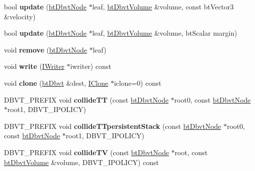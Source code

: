 \begin{DoxyCompactItemize}
\mbox{\label{structbtDbvt_ac4ec3a1dec7bc12e0803159a6d53e4b3}} 
bool {\bfseries update} (\hyperlink{structbtDbvtNode}{bt\+Dbvt\+Node} $\ast$leaf, \hyperlink{structbtDbvtAabbMm}{bt\+Dbvt\+Volume} \&volume, const bt\+Vector3 \&velocity)
\item 
\mbox{\label{structbtDbvt_a0f6e436b7a7dd41d1ea1b732b26f0a5c}} 
bool {\bfseries update} (\hyperlink{structbtDbvtNode}{bt\+Dbvt\+Node} $\ast$leaf, \hyperlink{structbtDbvtAabbMm}{bt\+Dbvt\+Volume} \&volume, bt\+Scalar margin)
\item 
\mbox{\label{structbtDbvt_ae01b804da6734f4ce250f6fe7ef0b5fb}} 
void {\bfseries remove} (\hyperlink{structbtDbvtNode}{bt\+Dbvt\+Node} $\ast$leaf)
\item 
\mbox{\label{structbtDbvt_a528b672e2aa8cbadb66943344bda6c2f}} 
void {\bfseries write} (\hyperlink{structbtDbvt_1_1IWriter}{I\+Writer} $\ast$iwriter) const
\item 
\mbox{\label{structbtDbvt_a8b6290efeae54596751fd11cc22a7dba}} 
void {\bfseries clone} (\hyperlink{structbtDbvt}{bt\+Dbvt} \&dest, \hyperlink{structbtDbvt_1_1IClone}{I\+Clone} $\ast$iclone=0) const
\item 
\mbox{\label{structbtDbvt_aeb3be68be0d863b1534996676a2aa416}} 
D\+B\+V\+T\+\_\+\+P\+R\+E\+F\+IX void {\bfseries collide\+TT} (const \hyperlink{structbtDbvtNode}{bt\+Dbvt\+Node} $\ast$root0, const \hyperlink{structbtDbvtNode}{bt\+Dbvt\+Node} $\ast$root1, D\+B\+V\+T\+\_\+\+I\+P\+O\+L\+I\+CY)
\item 
\mbox{\label{structbtDbvt_ad42b74ec72d83f4de65e1e78ad5bc012}} 
D\+B\+V\+T\+\_\+\+P\+R\+E\+F\+IX void {\bfseries collide\+T\+Tpersistent\+Stack} (const \hyperlink{structbtDbvtNode}{bt\+Dbvt\+Node} $\ast$root0, const \hyperlink{structbtDbvtNode}{bt\+Dbvt\+Node} $\ast$root1, D\+B\+V\+T\+\_\+\+I\+P\+O\+L\+I\+CY)
\item 
\mbox{\label{structbtDbvt_a8418e9b4725f6e4ab73bbe4dbc4de7ea}} 
D\+B\+V\+T\+\_\+\+P\+R\+E\+F\+IX void {\bfseries collide\+TV} (const \hyperlink{structbtDbvtNode}{bt\+Dbvt\+Node} $\ast$root, const \hyperlink{structbtDbvtAabbMm}{bt\+Dbvt\+Volume} \&volume, D\+B\+V\+T\+\_\+\+I\+P\+O\+L\+I\+CY) const

\end{DoxyCompactItemize}
